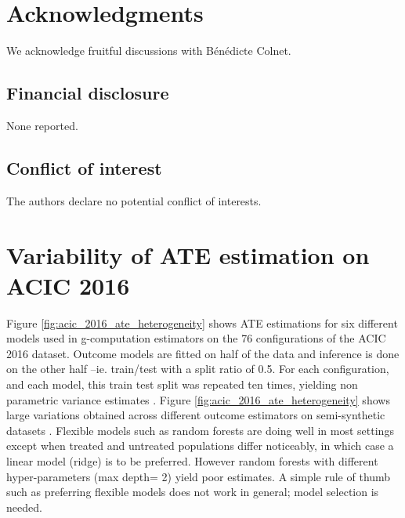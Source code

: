\documentclass[10pt,twocolumn]{article}
\begin{document}
\section*{Acknowledgments}

We acknowledge fruitful discussions with Bénédicte Colnet.

\subsection*{Financial disclosure}

None reported.

\subsection*{Conflict of interest}

The authors declare no potential conflict of interests.

\printbibliography

\clearpage

\onecolumn

\appendix
\setcounter{secnumdepth}{3}


\section{Variability of ATE estimation on ACIC
  2016}\label{apd:toy_example:acic_2016_ate_variability}

Figure \ref{fig:acic_2016_ate_heterogeneity} shows ATE estimations for six
different models used in g-computation estimators on the 76 configurations of
the ACIC 2016 dataset. Outcome models are fitted on half of the data and
inference is done on the other half --ie. train/test with a split ratio of 0.5.
For each configuration, and each model, this train test split was repeated ten
times, yielding non parametric variance estimates
\cite{bouthillier_accounting_2021}. Figure \ref{fig:acic_2016_ate_heterogeneity}
shows large variations obtained across different outcome estimators on
semi-synthetic datasets \cite{dorie_automated_2019}. Flexible models such as
random forests are doing well in most settings except when treated and untreated
populations differ noticeably, in which case a linear model (ridge) is to be
preferred. However random forests with different hyper-parameters (max depth= 2)
yield poor estimates. A simple rule of thumb such as preferring flexible models
does not work in general; model selection is needed.
\end{document}
